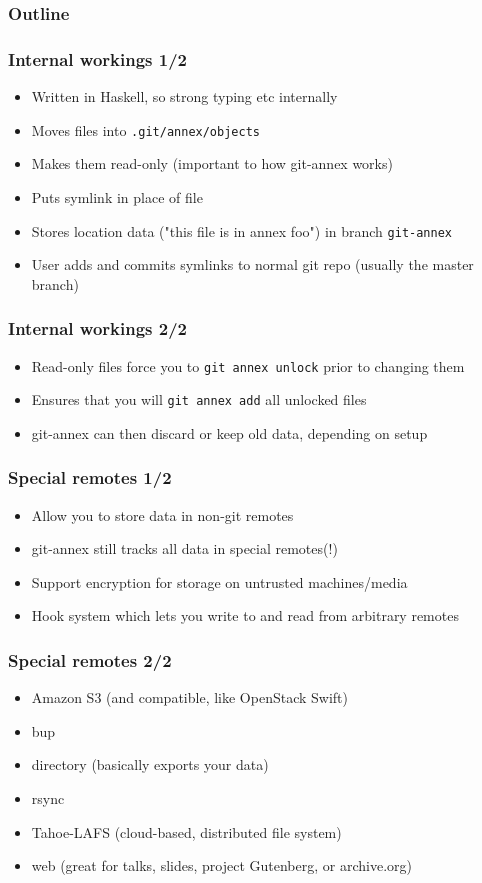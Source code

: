 \documentclass[t]{beamer}
\begin{document}
\begin{frame}
	\frametitle{Outline}
	\tableofcontents[currentsection]
\end{frame}

\begin{frame}
	\frametitle{Internal workings 1/2}
	\begin{itemize}
		\item Written in Haskell, so strong typing etc internally
		\item Moves files into \texttt{.git/annex/objects}
		\item Makes them read-only (important to how git-annex works)
		\item Puts symlink in place of file
		\item Stores location data ("this file is in annex foo") in branch \texttt{git-annex}
		\item User adds and commits symlinks to normal git repo (usually the master branch)
	\end{itemize}
\end{frame}

\begin{frame}
	\frametitle{Internal workings 2/2}
	\begin{itemize}
		\item Read-only files force you to \texttt{git annex unlock} prior to changing them
		\item Ensures that you will \texttt{git annex add} all unlocked files
		\item git-annex can then discard or keep old data, depending on setup
	\end{itemize}
\end{frame}

\begin{frame}
	\frametitle{Special remotes 1/2}
	\begin{itemize}
		\item Allow you to store data in non-git remotes
		\item git-annex still tracks all data in special remotes(!)
		\item Support encryption for storage on untrusted machines/media
		\item Hook system which lets you write to and read from arbitrary remotes
	\end{itemize}
\end{frame}

\begin{frame}
	\frametitle{Special remotes 2/2}
	\begin{itemize}
		\item Amazon S3 (and compatible, like OpenStack Swift)
		\item bup
		\item directory (basically exports your data)
		\item rsync
		\item Tahoe-LAFS (cloud-based, distributed file system)
		\item web (great for talks, slides, project Gutenberg, or archive.org)
	\end{itemize}
\end{frame}
\end{document}
